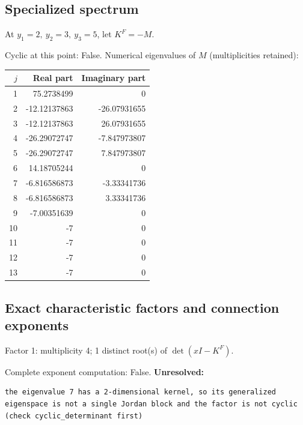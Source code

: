 \documentclass[10pt,a4paper]{article}
\newcommand{\fitmath}[1]{\sbox{\mathbox}{$\displaystyle #1$}\ifdim\wd\mathbox>\linewidth\resizebox{\linewidth}{!}{\usebox{\mathbox}}\else\usebox{\mathbox}\fi}
\begin{document}
\subsection*{Specialized spectrum}
At $y_1=2,\ y_2=3,\ y_3=5$, let $K^F=-M$.
\begin{center}\fitmath{\Delta=0}\end{center}
Cyclic at this point: False.
Numerical eigenvalues of $M$ (multiplicities retained):
\begin{center}\small\begin{tabular}{rrr}\toprule $j$ & Real part & Imaginary part\\\midrule
1 & 75.2738499 & 0\\
2 & -12.12137863 & -26.07931655\\
3 & -12.12137863 & 26.07931655\\
4 & -26.29072747 & -7.847973807\\
5 & -26.29072747 & 7.847973807\\
6 & 14.18705244 & 0\\
7 & -6.816586873 & -3.33341736\\
8 & -6.816586873 & 3.33341736\\
9 & -7.00351639 & 0\\
10 & -7 & 0\\
11 & -7 & 0\\
12 & -7 & 0\\
13 & -7 & 0\\
\bottomrule\end{tabular}\end{center}
\subsection*{Exact characteristic factors and connection exponents}
Factor 1: multiplicity 4; 1 distinct root(s) of $\det(xI-K^F)$.
\begin{center}\fitmath{\begin{aligned}p_{1}(x)&=x - 7\end{aligned}}\end{center}
Complete exponent computation: False.
\textbf{Unresolved:}

\begin{lstlisting}
the eigenvalue 7 has a 2-dimensional kernel, so its generalized eigenspace is not a single Jordan block and the factor is not cyclic (check cyclic_determinant first)
\end{lstlisting}
\end{document}
